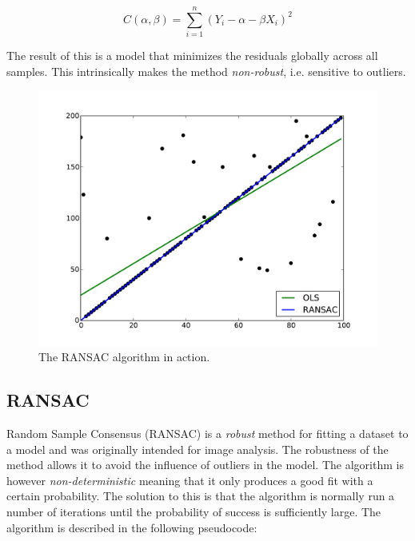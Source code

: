 \documentclass[a4paper]{report}
\begin{document}
\begin{equation}
    C(\alpha, \beta) = \sum_{i=1}^n(Y_i - \alpha - \beta X_i)^2
\end{equation}

The result of this is a model that minimizes the residuals globally across all
samples. This intrinsically makes the method \emph{non-robust}, i.e. sensitive
to outliers.

\begin{figure}[t]
    \includegraphics[width=\linewidth]{ransac}
    \caption{The RANSAC algorithm in action.}
    \label{fig:ransac}
\end{figure}

\subsection{RANSAC}
Random Sample Consensus (RANSAC) \citep{fischler81} is a \emph{robust} method
for fitting a dataset to a model and was originally intended for image
analysis. The robustness of the method allows it to avoid the
influence of outliers in the model. The algorithm is however
\emph{non-deterministic} meaning that it only produces a good fit with a
certain probability. The solution to this is that the algorithm is normally
run a number of iterations until the probability of success is sufficiently
large. The algorithm is described in the following pseudocode:
\end{document}

